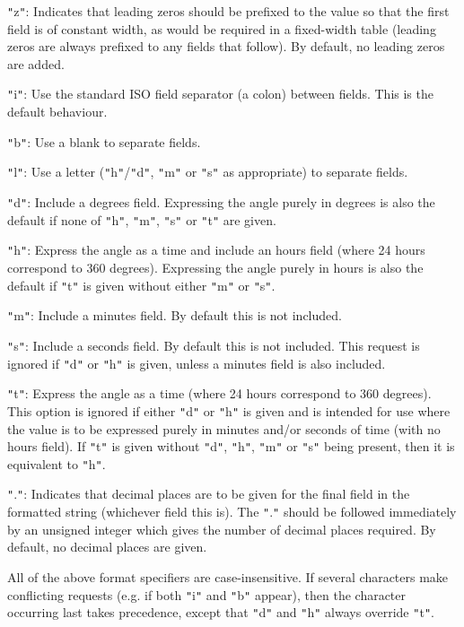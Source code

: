 \documentclass[twoside,11pt]{article}
\begin{document}
{{{         \sstitem
         {\tt{"}}z{\tt{"}}: Indicates that leading zeros should be prefixed to the
         value so that the first field is of constant width, as would be
         required in a fixed-width table (leading zeros are always
         prefixed to any fields that follow). By default, no leading
         zeros are added.

         \sstitem
         {\tt{"}}i{\tt{"}}: Use the standard ISO field separator (a colon) between
         fields. This is the default behaviour.

         \sstitem
         {\tt{"}}b{\tt{"}}: Use a blank to separate fields.

         \sstitem
         {\tt{"}}l{\tt{"}}: Use a letter ({\tt{"}}h{\tt{"}}/{\tt{"}}d{\tt{"}}, {\tt{"}}m{\tt{"}} or {\tt{"}}s{\tt{"}} as appropriate) to
         separate fields.

         \sstitem
         {\tt{"}}d{\tt{"}}: Include a degrees field. Expressing the angle purely in
         degrees is also the default if none of {\tt{"}}h{\tt{"}}, {\tt{"}}m{\tt{"}}, {\tt{"}}s{\tt{"}} or {\tt{"}}t{\tt{"}} are
         given.

         \sstitem
         {\tt{"}}h{\tt{"}}: Express the angle as a time and include an hours field
         (where 24 hours correspond to 360 degrees). Expressing the angle
         purely in hours is also the default if {\tt{"}}t{\tt{"}} is given without
         either {\tt{"}}m{\tt{"}} or {\tt{"}}s{\tt{"}}.

         \sstitem
         {\tt{"}}m{\tt{"}}: Include a minutes field. By default this is not included.

         \sstitem
         {\tt{"}}s{\tt{"}}: Include a seconds field. By default this is not included.
         This request is ignored if {\tt{"}}d{\tt{"}} or {\tt{"}}h{\tt{"}} is given, unless a minutes
         field is also included.

         \sstitem
         {\tt{"}}t{\tt{"}}: Express the angle as a time (where 24 hours correspond to
         360 degrees). This option is ignored if either {\tt{"}}d{\tt{"}} or {\tt{"}}h{\tt{"}} is
         given and is intended for use where the value is to be expressed
         purely in minutes and/or seconds of time (with no hours
         field). If {\tt{"}}t{\tt{"}} is given without {\tt{"}}d{\tt{"}}, {\tt{"}}h{\tt{"}}, {\tt{"}}m{\tt{"}} or {\tt{"}}s{\tt{"}} being
         present, then it is equivalent to {\tt{"}}h{\tt{"}}.

         \sstitem
         {\tt{"}}.{\tt{"}}: Indicates that decimal places are to be given for the
         final field in the formatted string (whichever field this
         is). The {\tt{"}}.{\tt{"}} should be followed immediately by an unsigned
         integer which gives the number of decimal places required. By
         default, no decimal places are given.

      }
      All of the above format specifiers are case-insensitive. If
      several characters make conflicting requests (e.g. if both {\tt{"}}i{\tt{"}}
      and {\tt{"}}b{\tt{"}} appear), then the character occurring last takes
      precedence, except that {\tt{"}}d{\tt{"}} and {\tt{"}}h{\tt{"}} always override {\tt{"}}t{\tt{"}}.
   }
}
\end{document}
